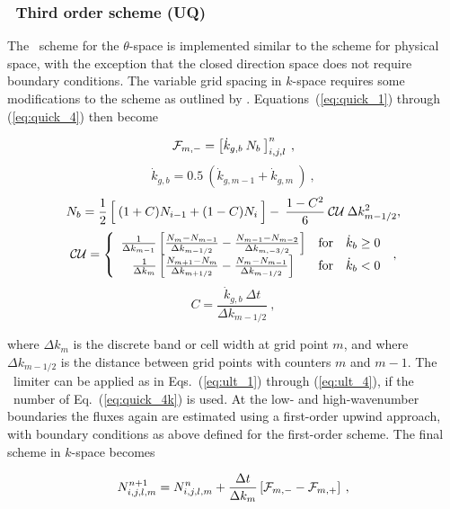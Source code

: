\vssub
\subsubsection{~Third  order scheme (UQ)}

\noindent
The \uq\ scheme for the $\theta$-space is implemented similar to the scheme
for physical space, with the exception that the closed direction space does
not require boundary conditions. The variable grid spacing in $k$-space
requires some modifications to the scheme as outlined by
\cite[{Appendix}]{art:Leo79}. Equations~(\ref{eq:quick_1}) through
(\ref{eq:quick_4}) then become


\begin{equation}
{\cal F}_{m,-} = \left [ \dot{k}_{g,b} \: N_b \: \right ]^n_{i,j,l}
\: , \label{eq:quick_1k}\end{equation} \begin{equation}
\dot{k}_{g,b} = 0.5 \: \left ( \dot{k}_{g,m-1} + \dot{k}_{g,m} 
\: \right )  \: , \label{eq:quick_1ak}
\end{equation} \begin{equation}
N_b = \frac{1}{2} \left [ \rule[0mm]{0mm}{\baselineskip} \: 
(1+C)N_{i-1} + (1-C)N_i \: \right ] - \:
\frac{1-C^2}{6} \: {\cal CU} \: \Delta k^2_{m-1/2}, \label{eq:quick_2k} \end{equation} \begin{equation}
{\cal CU} =  \left \{ \begin{array}{ccc}
\frac{1}{\Delta k_{m-1}}
\left [ \frac{N_{ m }-N_{m-1}}{\Delta k_{m-1/2}} - 
        \frac{N_{m-1}-N_{m-2}}{\Delta k_{m,-3/2}} \right ]
               & \mbox{for} & \dot{k}_b \geq 0 \\
\frac{1}{\Delta k_m}
\left [ \frac{N_{m+1}-N_{ m }}{\Delta k_{m+1/2}} -
       \frac{N_{ m }-N_{m-1}}{\Delta k_{m-1/2}} \right ]
               & \mbox{for} & \dot{k}_b   <  0
\end{array} \right . \: , \label{eq:quick_3k}
\end{equation} \begin{equation}
C = \frac{\dot{k}_{g,b} \: \Delta t}{\Delta k_{m-1/2}}
\: , \label{eq:quick_4k} \end{equation}

\noindent
where $\Delta k_m$ is the discrete band or cell width at grid point $m$, and
where $\Delta k_{m-1/2}$ is the distance between grid points with counters $m$
and $m-1$. The \ult\ limiter can be applied as in Eqs.~(\ref{eq:ult_1})
through (\ref{eq:ult_4}), if the \cfl\ number of Eq.~(\ref{eq:quick_4k}) is
used. At the low- and high-wavenumber boundaries the fluxes again are
estimated using a first-order upwind approach, with boundary conditions as
above defined for the first-order scheme. The final scheme in $k$-space
becomes


\begin{equation}
N_{i,j,l,m}^{n+1} = N_{i,j,l,m}^n 
 + \frac{\Delta t}{\Delta k_m} \left [ {\cal F}_{m,-} - {\cal F}_{m,+} \right ]
\: , \label{eq:uq_k_tot} \end{equation}